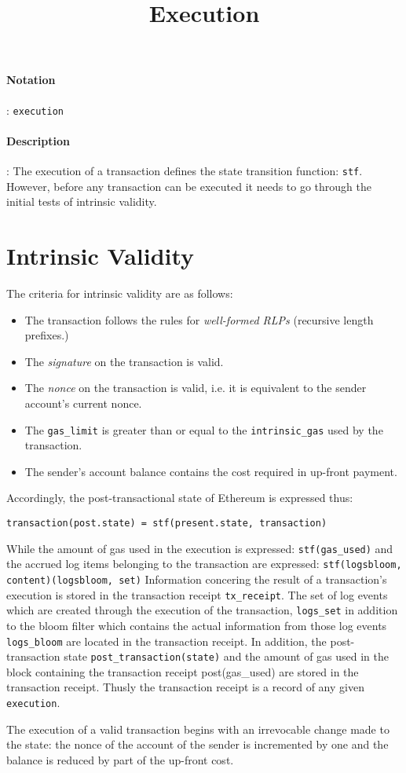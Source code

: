 \documentclass[10pt,a4paper,oneside]{scrartcl}
\author{}
\title{Execution}
\date{}
\begin{document}
\maketitle
\paragraph{Notation}: \texttt{execution}
\paragraph{Description}: The execution of a transaction defines the state transition function: \texttt{stf}. However, before any transaction can be executed it needs to go through the initial tests of intrinsic validity. 

\section{Intrinsic Validity}

The criteria for intrinsic validity are as follows:

	\begin{itemize}
		\item The transaction follows the rules for \textsl{well-formed RLPs} (recursive length prefixes.)
		\item The \textsl{signature} on the transaction is valid.
		\item The \textsl{nonce} on the transaction is valid, i.e. it is equivalent to the sender account's current nonce.
		\item The \texttt{gas\_limit} is greater than or equal to the \texttt{intrinsic\_gas} used by the transaction.
		\item The sender's account balance contains the cost required in up-front payment.
	\end{itemize}

Accordingly, the post-transactional state of Ethereum is expressed thus: 

	\begin{lstlisting}
transaction(post.state) = stf(present.state, transaction)  
	\end{lstlisting}
While the amount of gas used in the execution is expressed: \texttt{stf(gas\_used)} and the accrued log items belonging to the transaction are expressed: \texttt{stf(logsbloom, content)(logsbloom, set)}
Information concering the result of a transaction's execution is stored in the transaction receipt \texttt{tx\_receipt}. The set of log events which are created through the execution of the transaction, \texttt{logs\_set} in addition to the bloom filter which contains the actual information from those log events \texttt{logs\_bloom} are located in the transaction receipt. In addition, the post-transaction state \texttt{post\_transaction(state)} and the amount of gas used in the block containing the transaction receipt post(gas\_used) are stored in the transaction receipt. Thusly the transaction receipt is a record of any given \texttt{execution}. \par

The execution of a valid transaction begins with an irrevocable change made to the state: the nonce of the account of the sender is incremented by one and the balance is reduced by part of the up-front cost.
\end{document}
